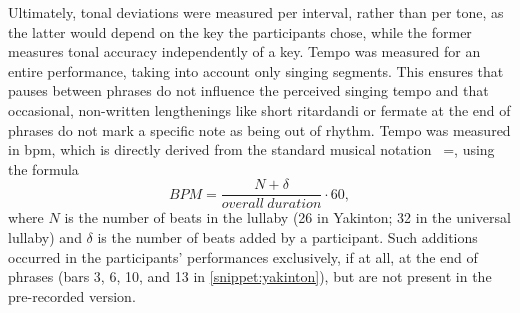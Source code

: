Ultimately, tonal deviations were measured per interval, rather than per tone, as the latter would depend on the key the participants chose, while the former measures tonal accuracy independently of a key.
Tempo was measured for an entire performance, taking into account only singing segments.
This ensures that pauses between phrases do not influence the perceived singing tempo and that occasional, non-written lengthenings like short ritardandi or fermate at the end of phrases do not mark a specific note as being out of rhythm.
Tempo was measured in \acf{bpm}, which is directly derived from the standard musical notation \musQuarter~=, using the formula
%
\begin{equation}
	\label{eq:bpm}
	BPM = \frac{N + \delta}{overall\ duration} \cdot 60,
\end{equation}
\noindent
%
where $N$ is the number of beats in the lullaby (26 in Yakinton; 32 in the universal lullaby) and $\delta$ is the number of beats added by a participant.
Such additions occurred in the participants' performances exclusively, if at all, at the end of phrases (bars 3, 6, 10, and 13 in \cref{snippet:yakinton}), but are not present in the pre-recorded version.


